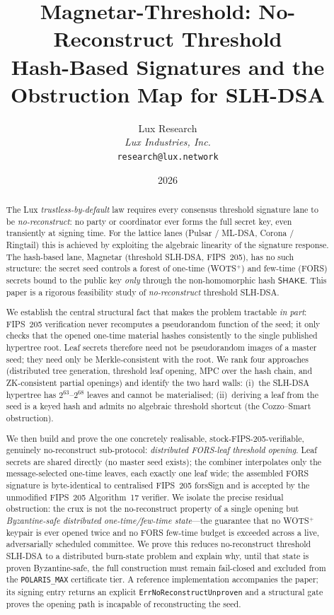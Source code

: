 \documentclass[11pt,a4paper]{article}
\title{Magnetar-Threshold: No-Reconstruct Threshold\\Hash-Based Signatures and the\\Obstruction Map for SLH-DSA}
\author{Lux Research \\ \textit{Lux Industries, Inc.} \\ \texttt{research@lux.network}}
\date{2026}
\begin{document}
\luxcoverpage

\maketitle

\begin{abstract}
The Lux \emph{trustless-by-default} law requires every consensus threshold
signature lane to be \emph{no-reconstruct}: no party or coordinator ever forms
the full secret key, even transiently at signing time. For the lattice lanes
(Pulsar / ML-DSA, Corona / Ringtail) this is achieved by exploiting the algebraic
linearity of the signature response. The hash-based lane, Magnetar
(threshold SLH-DSA, FIPS~205), has no such structure: the secret seed controls a
forest of one-time (WOTS$^+$) and few-time (FORS) secrets bound to the public key
\emph{only} through the non-homomorphic hash $\mathsf{SHAKE}$. This paper is a
rigorous feasibility study of \emph{no-reconstruct} threshold SLH-DSA.

We establish the central structural fact that makes the problem tractable
\emph{in part}: FIPS~205 verification never recomputes a pseudorandom function of
the seed; it only checks that the opened one-time material hashes consistently to
the single published hypertree root. Leaf secrets therefore need not be
pseudorandom images of a master seed; they need only be Merkle-consistent with the
root. We rank four approaches (distributed tree generation, threshold leaf
opening, MPC over the hash chain, and ZK-consistent partial openings) and identify
the two hard walls: (i)~the SLH-DSA hypertree has $2^{63}\text{--}2^{68}$ leaves
and cannot be materialised; (ii)~deriving a leaf from the seed is a keyed hash and
admits no algebraic threshold shortcut (the Cozzo--Smart obstruction).

We then build and prove the one concretely realisable, stock-FIPS-205-verifiable,
genuinely no-reconstruct sub-protocol: \emph{distributed FORS-leaf threshold
opening}. Leaf secrets are shared directly (no master seed exists); the combiner
interpolates only the message-selected one-time leaves, each exactly one leaf
wide; the assembled FORS signature is byte-identical to centralised FIPS~205
\textsf{forsSign} and is accepted by the unmodified FIPS~205 Algorithm~17 verifier.
We isolate the precise residual obstruction: the crux is not the no-reconstruct
property of a single opening but \emph{Byzantine-safe distributed one-time/few-time
state}---the guarantee that no WOTS$^+$ keypair is ever opened twice and no FORS
few-time budget is exceeded across a live, adversarially scheduled committee. We
prove this reduces no-reconstruct threshold SLH-DSA to a distributed burn-state
problem and explain why, until that state is proven Byzantine-safe, the full
construction must remain fail-closed and excluded from the \texttt{POLARIS\_MAX}
certificate tier. A reference implementation accompanies the paper; its signing
entry returns an explicit \texttt{ErrNoReconstructUnproven} and a structural gate
proves the opening path is incapable of reconstructing the seed.
\end{abstract}
\end{document}
